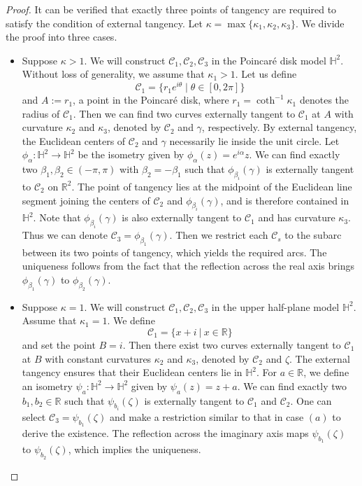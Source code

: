\documentclass[11pt,leqno]{article}
\numberwithin{equation}{section}
\theoremstyle{definition}
\begin{document}
\begin{proof}
It can be verified that exactly three points of tangency are required to satisfy the condition of external tangency.
Let $\kappa=\max\{\kappa_1,\kappa_2,\kappa_3\}$. We divide the proof into three cases.
\begin{itemize}
\item[($a$)] Suppose $\kappa>1$. We will construct $\mathcal C_1, \mathcal C_2, \mathcal C_3$ in the Poincar\'e disk model $\mathbb{H}^2$. Without loss of generality, we assume that $\kappa_1>1$. Let us define
 \[\mathcal C_1=\big\{r_1e^{i\theta}\mid\theta\in[0,2\pi]\big\}\]
 and $A:=r_1$, a point in the Poincar\'e disk, where \( r_1 = \coth^{-1} \kappa_1 \) denotes the radius of \( \mathcal{C}_1 \). Then we can find two curves externally tangent to $\mathcal C_1$ at $A$ with curvature $\kappa_2$ and $\kappa_3$, denoted by $\mathcal C_2$ and $\gamma$, respectively. By external tangency, the Euclidean centers of $\mathcal C_2$ and $\gamma$ necessarily lie inside the unit circle. Let $\phi_{\alpha}:\mathbb{H}^2\to\mathbb{H}^2$ be the isometry given by $\phi_{\alpha}(z)=e^{i\alpha}z$. We can find exactly two $\beta_1,\beta_2\in(-\pi,\pi)$ with $\beta_2=-\beta_1$ such that $\phi_{\beta_i}(\gamma)$ is externally tangent to $\mathcal C_2$ on $\mathbb{R}^2$. The point of tangency lies at the midpoint of the Euclidean line segment joining the centers of $\mathcal C_2$ and $\phi_{\beta_i}(\gamma)$, and is therefore contained in $\mathbb{H}^2$. Note that $\phi_{\beta_i}(\gamma)$ is also externally tangent to $\mathcal C_1$ and has curvature $\kappa_3$. Thus we can denote $\mathcal C_3=\phi_{\beta_1}(\gamma)$.
 Then we restrict each \(\mathcal{C}_s\) to the subarc between its two points of tangency, which yields the required arcs.
The uniqueness follows from the fact that the reflection across the real axis brings $\phi_{\beta_1}(\gamma)$ to $\phi_{\beta_2}(\gamma)$.
\item[($b$)] Suppose $\kappa=1$. We will construct $\mathcal C_1, \mathcal C_2, \mathcal C_3$ in the upper half-plane model $\mathbb{H}^2$. Assume that $\kappa_1=1$. We define
    \[\mathcal C_1=\{x+i\ |\ x\in\mathbb{R}\}\]
    and set the point $B=i$. Then there exist two curves externally tangent to $\mathcal C_1$ at $B$ with constant curvatures $\kappa_2$ and $\kappa_3$, denoted by $\mathcal C_2$ and $\zeta$.
    The external tangency ensures that their Euclidean centers lie in $\mathbb{H}^2$.
    For $a\in\mathbb{R}$, we define an isometry $\psi_a:\mathbb{H}^2\to\mathbb{H}^2$ given by $\psi_a(z)=z+a$.
    We can find exactly two $b_1, b_2\in\mathbb{R}$ such that $\psi_{b_i}(\zeta)$ is externally tangent to $\mathcal C_1$ and $\mathcal C_2$. One can select $\mathcal C_3=\psi_{b_1}(\zeta)$ and make a restriction similar to that in case $(a)$ to derive the existence.  The reflection across the imaginary axis maps $\psi_{b_1}(\zeta)$ to $\psi_{b_2}(\zeta)$, which implies the uniqueness.



\end{itemize}
\end{proof}
\end{document}
